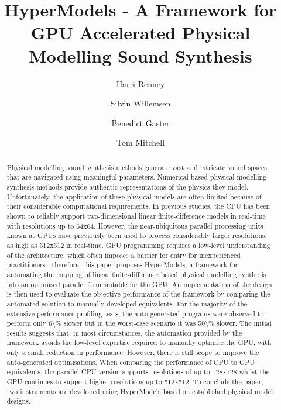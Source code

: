 \documentclass[sigconf]{nimeart}
\begin{document}
\title[HyperModels - A Framework for GPU Accelerated Physical Modelling…]{HyperModels - A Framework for GPU Accelerated Physical Modelling Sound Synthesis}
\author{Harri Renney}
\author{Silvin Willemsen}
\author{Benedict Gaster}
\author{Tom Mitchell}
\renewcommand{\shortauthors}{Renney et al.}
\begin{abstract}
Physical modelling sound synthesis methods generate vast and intricate sound spaces that are navigated using meaningful parameters. Numerical based physical modelling synthesis methods provide authentic representations of the physics they model. Unfortunately, the application of these physical models are often limited because of their considerable computational requirements. In previous studies, the CPU has been shown to reliably support two-dimensional linear finite-difference models in real-time with resolutions up to 64x64. However, the near-ubiquitous parallel processing units known as GPUs have previously been used to process considerably larger resolutions, as high as 512x512 in real-time. GPU programming requires a low-level understanding of the architecture, which often imposes a barrier for entry for inexperienced practitioners. Therefore, this paper proposes HyperModels, a framework for automating the mapping of linear finite-difference based physical modelling synthesis into an optimised parallel form suitable for the GPU. An implementation of the design is then used to evaluate the objective performance of the framework by comparing the automated solution to manually developed equivalents. For the majority of the extensive performance profiling tests, the auto-generated programs were observed to perform only 6\textbackslash\% slower but in the worst-case scenario it was 50\textbackslash\% slower. The initial results suggests that, in most circumstances, the automation provided by the framework avoids the low-level expertise required to manually optimise the GPU, with only a small reduction in performance. However, there is still scope to improve the auto-generated optimisations. When comparing the performance of CPU to GPU equivalents, the parallel CPU version supports resolutions of up to 128x128 whilst the GPU continues to support higher resolutions up to 512x512. To conclude the paper, two instruments are developed using HyperModels based on established physical model designs.
\end{abstract}
\end{document}
